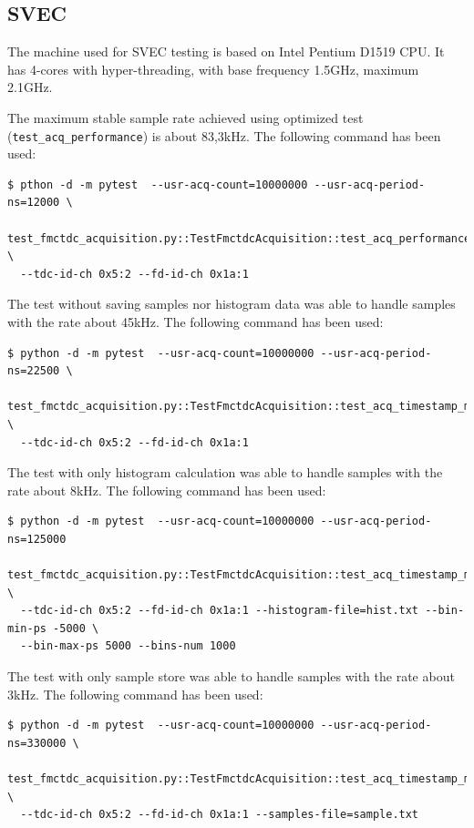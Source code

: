 \documentclass[a4paper, 12pt]{article}
\begin{document}
\subsection{SVEC}
\label{perf_svec}

The machine used for SVEC testing is based on
Intel Pentium D1519\cite{svec.cpu} CPU.
It has 4-cores with hyper-threading, with base frequency 1.5GHz, maximum 2.1GHz.

The maximum stable sample rate achieved using optimized test
(\texttt{test\_acq\_performance}) is
about 83,3kHz. The following command has been used:
\begin{lstlisting}
$ pthon -d -m pytest  --usr-acq-count=10000000 --usr-acq-period-ns=12000 \
  test_fmctdc_acquisition.py::TestFmctdcAcquisition::test_acq_performance \
  --tdc-id-ch 0x5:2 --fd-id-ch 0x1a:1
\end{lstlisting}

The test without saving samples nor histogram data was able to handle samples
with the rate about 45kHz.
The following command has been used:
\begin{lstlisting}
$ python -d -m pytest  --usr-acq-count=10000000 --usr-acq-period-ns=22500 \
  test_fmctdc_acquisition.py::TestFmctdcAcquisition::test_acq_timestamp_multiple_hist \
  --tdc-id-ch 0x5:2 --fd-id-ch 0x1a:1
\end{lstlisting}

The test with only histogram calculation was able to handle samples with the
rate about 8kHz. The following command has been used:
\begin{lstlisting}
$ python -d -m pytest  --usr-acq-count=10000000 --usr-acq-period-ns=125000
  test_fmctdc_acquisition.py::TestFmctdcAcquisition::test_acq_timestamp_multiple_hist \
  --tdc-id-ch 0x5:2 --fd-id-ch 0x1a:1 --histogram-file=hist.txt --bin-min-ps -5000 \
  --bin-max-ps 5000 --bins-num 1000
\end{lstlisting}

The test with only sample store was able to handle samples with the
rate about 3kHz. The following command has been used:
\begin{lstlisting}
$ python -d -m pytest  --usr-acq-count=10000000 --usr-acq-period-ns=330000 \
  test_fmctdc_acquisition.py::TestFmctdcAcquisition::test_acq_timestamp_multiple_hist \
  --tdc-id-ch 0x5:2 --fd-id-ch 0x1a:1 --samples-file=sample.txt
\end{lstlisting}
\end{document}
